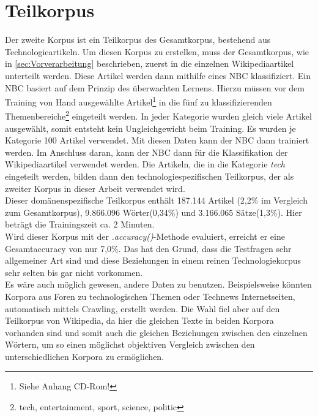\documentclass[12pt,a4paper]{report}
\begin{document}
	\section{Teilkorpus}
	\label{sec:Teilkorpus}	
	Der zweite Korpus ist ein Teilkorpus des Gesamtkorpus, bestehend aus Technologieartikeln. Um diesen Korpus zu erstellen, muss der Gesamtkorpus, wie in \ref{sec:Vorverarbeitung} beschrieben, zuerst in die einzelnen Wikipediaartikel unterteilt werden. Diese Artikel werden dann mithilfe eines NBC klassifiziert. Ein NBC basiert auf dem Prinzip des überwachten Lernens. Hierzu müssen vor dem Training von Hand ausgewählte Artikel\footnote{Siehe Anhang CD-Rom!} in die fünf zu klassifizierenden Themenbereiche\footnote{tech, entertainment, sport, science, politic} eingeteilt werden. In jeder Kategorie wurden gleich viele Artikel ausgewählt, somit entsteht kein Ungleichgewicht beim Training. Es wurden je Kategorie 100 Artikel verwendet. Mit diesen Daten kann der NBC dann trainiert werden. Im Anschluss daran, kann der NBC dann für die Klassifikation der Wikipediaartikel verwendet werden. Die Artikeln, die in die Kategorie \textit{tech} eingeteilt werden, bilden dann den technologiespezifischen Teilkorpus, der als zweiter Korpus in dieser Arbeit verwendet wird.\\
	
	
	Dieser domänenspezifische Teilkorpus enthält 187.144 Artikel (2,2\% im Vergleich zum Gesamtkorpus), 9.866.096 Wörter(0,34\%) und 3.166.065 Sätze(1,3\%). Hier beträgt die Trainingszeit ca. 2 Minuten.\\
	Wird dieser Korpus mit der \textit{.accuracy()}-Methode evaluiert, erreicht er eine Gesamtaccuracy von nur 7,0\%. Das hat den Grund, dass die Testfragen sehr allgemeiner Art sind und diese Beziehungen in einem reinen Technologiekorpus sehr selten bis gar nicht vorkommen.\\
	
	Es wäre auch möglich gewesen, andere Daten zu benutzen. Beispielsweise könnten Korpora aus Foren zu technologischen Themen oder Technews Internetseiten, automatisch mittels Crawling, erstellt werden. Die Wahl fiel aber auf den Teilkorpus von Wikipedia, da hier die gleichen Texte in beiden Korpora vorhanden sind und somit auch die gleichen Beziehungen zwischen den einzelnen Wörtern, um so einen möglichst objektiven Vergleich zwischen den unterschiedlichen Korpora zu ermöglichen.\\
	
	
\end{document}
